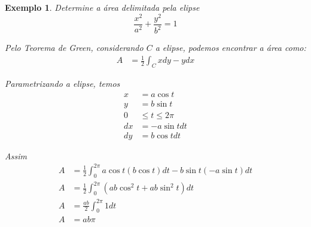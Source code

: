 \documentclass{article}
\newtheorem{example}{Exemplo}[section]
\begin{document}
        \begin{example}
            Determine a área delimitada pela elipse
            \[
                \frac{x^2}{a^2} + \frac{y^2}{b^2} = 1
            \]

            Pelo Teorema de Green, considerando $C$ a elipse, podemos encontrar a área como:
            \begin{align*}
                A &= \frac{1}{2} \int_C x dy - y dx
            \end{align*}

            Parametrizando a elipse, temos
            \begin{align*}
                x &= a \cos t\\
                y &= b \sin t\\
                0 &\leq t \leq 2\pi\\
                dx &= -a \sin t dt\\
                dy &= b \cos t dt
            \end{align*}

            Assim
            \begin{align*}
                A &= \frac{1}{2} \int_0^{2\pi} a \cos t (b \cos t) dt - b \sin t (-a \sin t) dt\\
                A &= \frac{1}{2} \int_0^{2\pi} (ab \cos^2 t + ab\sin^2 t) dt\\
                A &= \frac{ab}{2} \int_0^{2\pi} 1 dt\\
                A &= ab \pi
            \end{align*}
        \end{example}
\end{document}
